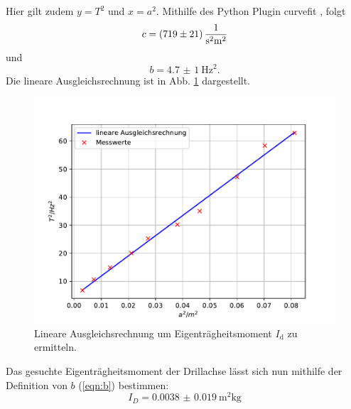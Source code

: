 Hier gilt zudem $y = T^2$ und $x = a^2$.
Mithilfe des Python Plugin curvefit \cite{scipy}, folgt
\begin{equation*}
    c = \SI{719(21)}{\frac{1}{\second^2 \metre^2}}
\end{equation*}
und
\begin{equation*}
    b = \SI{4.7(10)}{\hertz^2} .
\end{equation*}
Die lineare Ausgleichsrechnung ist in Abb. \ref{fig:ausgleich} dargestellt.
\begin{figure}
    \centering
    \includegraphics[width=\textwidth]{content/data/ausgleich.pdf}
    \caption{Lineare Ausgleichsrechnung um Eigenträgheitsmoment $I_\text{d}$ zu ermitteln. \cite{matplotlib}}
    \label{fig:ausgleich}
\end{figure}
Das gesuchte Eigenträgheitsmoment der Drillachse lässt sich nun mithilfe der Definition von $b$ (\autoref{eqn:b}) bestimmen:
\begin{equation*}
    I_D = \SI{0.0038(190)}{\metre^2\kg}
\end{equation*}

\FloatBarrier


